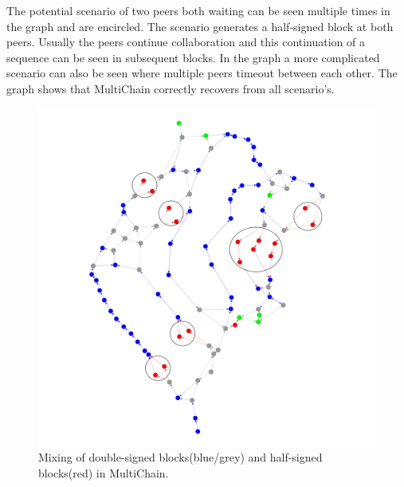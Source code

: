 The potential scenario of two peers both waiting can be seen multiple times in the graph and are encircled.
The scenario generates a half-signed block at both peers.
Usually the peers continue collaboration and this continuation of a sequence can be seen in subsequent blocks.
In the graph a more complicated scenario can also be seen where multiple peers timeout between each other.
The graph shows that MultiChain correctly recovers from all scenario's.

\begin{figure}
	\centerline{\includegraphics[scale=0.1]{experimentation/deadlock/deadlock.png}}
	\caption{Mixing of double-signed blocks(blue/grey) and half-signed blocks(red) in MultiChain.}
	\label{fig:deadlock-double}
\end{figure}